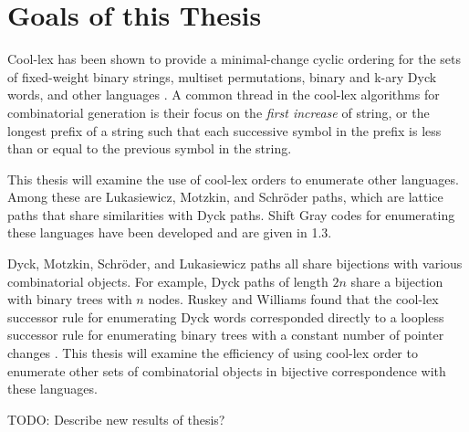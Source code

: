 
\section{Goals of this Thesis}

Cool-lex has been shown to provide a minimal-change cyclic ordering for the sets of fixed-weight binary strings, multiset permutations, binary and k-ary Dyck words, and other languages \cite{williams2009shift}. A common thread in the cool-lex algorithms for combinatorial generation is their focus on the \emph{first increase} of string, or the longest prefix of a string such that each successive symbol in the prefix is less than or equal to the previous symbol in the string.

This thesis will examine the use of cool-lex orders to enumerate other languages. Among these are Lukasiewicz, Motzkin, and Schröder paths, which are lattice paths that share similarities with Dyck paths. Shift Gray codes for enumerating these languages have been developed and are given in 1.3.

Dyck, Motzkin, Schröder, and Lukasiewicz paths all share bijections with various combinatorial objects. For example, Dyck paths of length $2n$ share a bijection with binary trees with $n$ nodes. Ruskey and Williams found that the cool-lex successor rule for enumerating Dyck words corresponded directly to a loopless successor rule for enumerating binary trees with a constant number of pointer changes \cite{ruskey2008generating}. This thesis will examine the efficiency of using cool-lex order to enumerate other sets of combinatorial objects in bijective correspondence with these languages.  

TODO: Describe new results of thesis?

